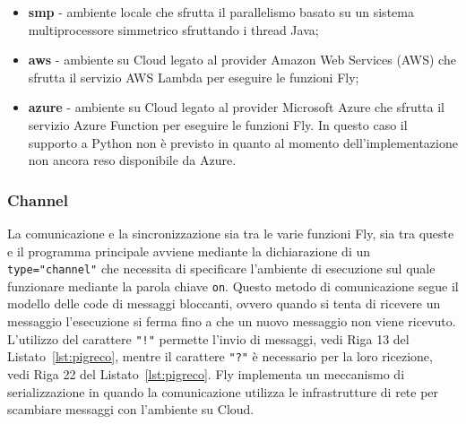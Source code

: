 \begin{itemize}
    \item \textbf{smp} - ambiente locale che sfrutta il parallelismo basato su un sistema multiprocessore simmetrico sfruttando i thread Java;
    
    \item \textbf{aws} - ambiente su Cloud legato al provider Amazon Web Services (AWS)  \cite{AmazonSite} che sfrutta il servizio AWS Lambda \cite{LambdaSite} per eseguire le funzioni Fly;
    
    \item \textbf{azure} - ambiente su Cloud legato al provider Microsoft Azure \cite{MicrosoftSite} che sfrutta il servizio Azure Function \cite{FunctionSite} per eseguire le funzioni Fly. In questo caso il supporto a Python non è previsto in quanto al momento dell'implementazione non ancora reso disponibile da Azure.
\end{itemize}

\subsubsection{Channel}
La comunicazione e la sincronizzazione sia tra le varie funzioni Fly, sia tra queste e il programma principale avviene mediante la dichiarazione di un \verb|type|\verb|=|\verb|"channel"| che necessita di specificare l'ambiente di esecuzione sul quale funzionare mediante la parola chiave \verb|on|. Questo metodo di comunicazione segue il modello delle code di messaggi bloccanti, ovvero quando si tenta di ricevere un messaggio l'esecuzione si ferma fino a che un nuovo messaggio non viene ricevuto. L'utilizzo del carattere \verb|"!"| permette l'invio di messaggi, vedi Riga 13 del Listato~\ref{lst:pigreco}, mentre il carattere \verb|"?"| è necessario per la loro ricezione, vedi Riga 22 del Listato~\ref{lst:pigreco}. Fly implementa un meccanismo di serializzazione in quando la comunicazione utilizza le infrastrutture di rete per scambiare messaggi con l'ambiente su Cloud.

